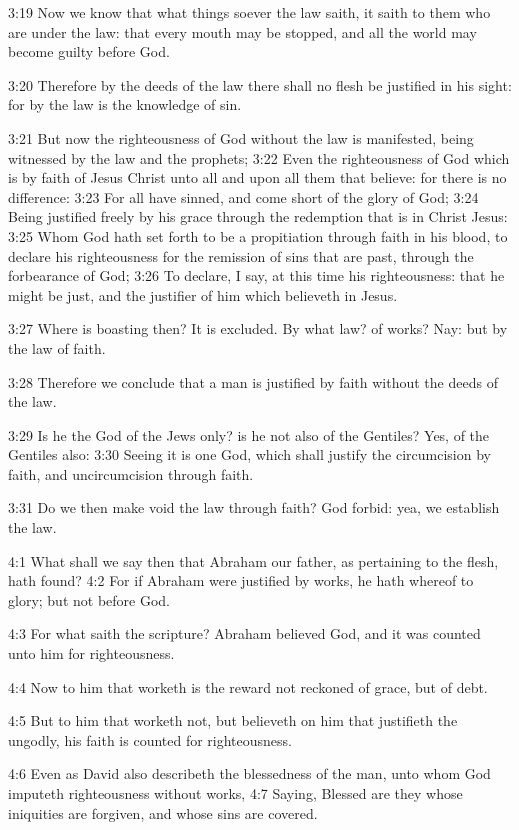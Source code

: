 3:19 Now we know that what things soever the law saith, it saith to
them who are under the law: that every mouth may be stopped, and all
the world may become guilty before God.

3:20 Therefore by the deeds of the law there shall no flesh be
justified in his sight: for by the law is the knowledge of sin.

3:21 But now the righteousness of God without the law is manifested,
being witnessed by the law and the prophets; 3:22 Even the
righteousness of God which is by faith of Jesus Christ unto all and
upon all them that believe: for there is no difference: 3:23 For all
have sinned, and come short of the glory of God; 3:24 Being justified
freely by his grace through the redemption that is in Christ Jesus:
3:25 Whom God hath set forth to be a propitiation through faith in his
blood, to declare his righteousness for the remission of sins that are
past, through the forbearance of God; 3:26 To declare, I say, at this
time his righteousness: that he might be just, and the justifier of
him which believeth in Jesus.

3:27 Where is boasting then? It is excluded. By what law? of works?
Nay: but by the law of faith.

3:28 Therefore we conclude that a man is justified by faith without
the deeds of the law.

3:29 Is he the God of the Jews only? is he not also of the Gentiles?
Yes, of the Gentiles also: 3:30 Seeing it is one God, which shall
justify the circumcision by faith, and uncircumcision through faith.

3:31 Do we then make void the law through faith? God forbid: yea, we
establish the law.

4:1 What shall we say then that Abraham our father, as pertaining to
the flesh, hath found?  4:2 For if Abraham were justified by works, he
hath whereof to glory; but not before God.

4:3 For what saith the scripture? Abraham believed God, and it was
counted unto him for righteousness.

4:4 Now to him that worketh is the reward not reckoned of grace, but
of debt.

4:5 But to him that worketh not, but believeth on him that justifieth
the ungodly, his faith is counted for righteousness.

4:6 Even as David also describeth the blessedness of the man, unto
whom God imputeth righteousness without works, 4:7 Saying, Blessed are
they whose iniquities are forgiven, and whose sins are covered.

